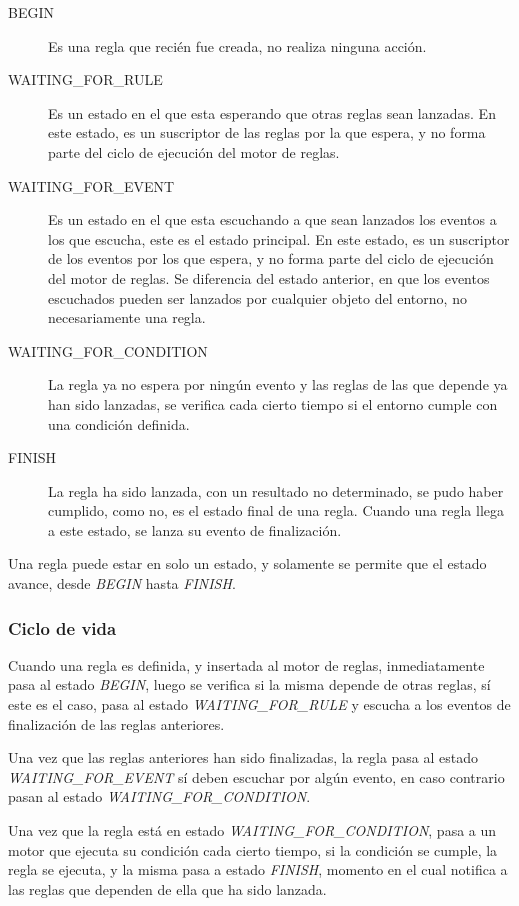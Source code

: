 \begin{description}
\item[BEGIN] Es una regla que recién fue creada, no realiza ninguna
	acción.
\item[WAITING\_FOR\_RULE] Es un estado en el que esta esperando que otras reglas
	sean lanzadas. En este estado, es un suscriptor de las reglas por la que
	espera, y no forma parte del ciclo de ejecución del motor de reglas.
\item[WAITING\_FOR\_EVENT] Es un estado en el que esta escuchando a que sean
	lanzados los eventos a los que escucha, este es el estado principal. En
	este estado, es un suscriptor de los eventos por los que espera, y no
	forma parte del ciclo de ejecución del motor de reglas. Se diferencia
	del estado anterior, en que los eventos escuchados pueden ser lanzados
	por cualquier objeto del entorno, no necesariamente una regla.
\item[WAITING\_FOR\_CONDITION] La regla ya no espera por ningún evento y las
	reglas de las que depende ya han sido lanzadas, se verifica cada cierto
	tiempo si el entorno cumple con una condición definida. 
\item[FINISH] La regla ha sido lanzada, con un resultado no determinado, se pudo
	haber cumplido, como no, es el estado final de una regla. Cuando una
	regla llega a este estado, se lanza su evento de finalización.
\end{description}

Una regla puede estar en solo un estado, y solamente se permite que el estado
avance, desde \emph{BEGIN} hasta \emph{FINISH}.


\subsubsection{Ciclo de vida}

Cuando una regla es definida, y insertada al motor de reglas, inmediatamente
pasa al estado \emph{BEGIN}, luego se verifica si la misma depende de otras
reglas, sí este es el caso, pasa al estado \emph{WAITING\_FOR\_RULE} y escucha a
los eventos de finalización de las reglas anteriores.

Una vez que las reglas anteriores han sido finalizadas, la regla pasa al estado
\emph{WAITING\_FOR\_EVENT} sí deben escuchar por algún evento, en caso contrario
pasan al estado \emph{WAITING\_FOR\_CONDITION}.

Una vez que la regla está en estado \emph{WAITING\_FOR\_CONDITION}, pasa a un
motor que ejecuta su condición cada cierto tiempo, si la condición se cumple, la
regla se ejecuta, y la misma pasa a estado \emph{FINISH}, momento en el cual
notifica a las reglas que dependen de ella que ha sido lanzada.

